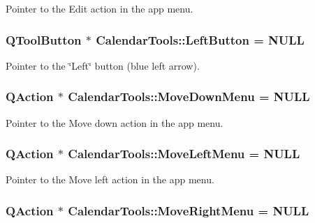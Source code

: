 Pointer to the Edit action in the app menu. 

\hypertarget{struct_calendar_tools_ab71ef476286fc32d4279dcb56ba670d5}{
\subsubsection[{Left\-Button}]{\setlength{\rightskip}{0pt plus 5cm}Q\-Tool\-Button $\ast$ Calendar\-Tools\-::\-Left\-Button = N\-U\-L\-L\hspace{0.3cm}{\ttfamily [static]}}}\label{struct_calendar_tools_ab71ef476286fc32d4279dcb56ba670d5}


Pointer to the \char`\"{}\-Left\char`\"{} button (blue left arrow). 

\hypertarget{struct_calendar_tools_a5a19b157c4c77918001ad466460c1a3a}{
\subsubsection[{Move\-Down\-Menu}]{\setlength{\rightskip}{0pt plus 5cm}Q\-Action $\ast$ Calendar\-Tools\-::\-Move\-Down\-Menu = N\-U\-L\-L\hspace{0.3cm}{\ttfamily [static]}}}\label{struct_calendar_tools_a5a19b157c4c77918001ad466460c1a3a}


Pointer to the Move down action in the app menu. 

\hypertarget{struct_calendar_tools_a174a6b8b94ae40062c8524780e62e711}{
\subsubsection[{Move\-Left\-Menu}]{\setlength{\rightskip}{0pt plus 5cm}Q\-Action $\ast$ Calendar\-Tools\-::\-Move\-Left\-Menu = N\-U\-L\-L\hspace{0.3cm}{\ttfamily [static]}}}\label{struct_calendar_tools_a174a6b8b94ae40062c8524780e62e711}


Pointer to the Move left action in the app menu. 

\hypertarget{struct_calendar_tools_a234dcaec9a66d3dcb95b3d310fe7e166}{
\subsubsection[{Move\-Right\-Menu}]{\setlength{\rightskip}{0pt plus 5cm}Q\-Action $\ast$ Calendar\-Tools\-::\-Move\-Right\-Menu = N\-U\-L\-L\hspace{0.3cm}{\ttfamily [static]}}}\label{struct_calendar_tools_a234dcaec9a66d3dcb95b3d310fe7e166}


